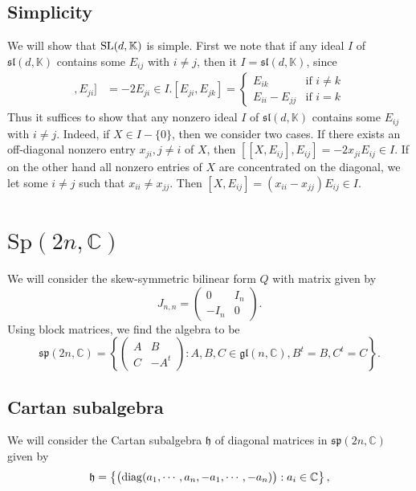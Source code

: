 \documentclass{report}
\begin{document}
\subsection{Simplicity}
We will show that $\operatorname{{\mathrm{SL}}}(d, \mathbb K)$ is simple.
First we note that if any ideal $I$ of $\mathfrak{sl}(d, \mathbb K)$ contains some $E_{ij}$ with $i \neq j$, then it $I = \mathfrak{sl}(d, \mathbb K)$, since
\begin{align*}
    [[E_{ij}, E_{ji}], E_{ji}] &= -2 E_{ji} \in I.
    [E_{ji}, E_{jk}] = \begin{cases}
        E_{ik} & \text{if } i \neq k\\
        E_{ii} - E_{jj} & \text{if } i = k
    \end{cases}
\end{align*}
Thus it suffices to show that any nonzero ideal $I$ of $\mathfrak{sl}(d, \mathbb K)$ contains some $E_{ij}$ with $i \neq j$.
Indeed, if $X \in I - \{0 \}$, then we consider two cases.
If there exists an off-diagonal nonzero entry $x_{ji}, j\neq i$ of $X$, then $[[X, E_{ij}], E_{ij}] = -2x_{ji}E_{ij} \in I$.
If on the other hand all nonzero entries of $X$ are concentrated on the diagonal, we let some $i \neq j$ such that $x_{ii} \neq x_{jj}$.
Then $[X, E_{ij}] = (x_{ii} - x_{jj})E_{ij} \in I$. 

\section{$\mathrm{Sp}(2n, \mathbb C)$}
We will consider the skew-symmetric bilinear form $Q$ with matrix given by
\[
J_{n,n} = \begin{pmatrix}
    0 & I_n\\
    -I_n & 0
\end{pmatrix}.
\]
Using block matrices, we find the algebra to be
\[
\mathfrak{sp}(2n, \mathbb C) = \left\{ \begin{pmatrix}
    A & B\\
    C & -A^t
\end{pmatrix}: A, B,C \in \mathfrak{gl}(n, \mathbb C), B^t = B, C^t = C
\right\}.
\]

\subsection{Cartan subalgebra}
We will consider the Cartan subalgebra $\mathfrak h$ of diagonal matrices in $\mathfrak{sp}(2n, \mathbb C)$ given by
\[
\mathfrak h = \left\{
    \begin{pmatrix}
        \operatorname{diag}(a_1,\cdots, a_n, -a_1,\cdots, -a_n)
    \end{pmatrix} : a_i \in \mathbb{C}    
\right\},
\]
\end{document}
